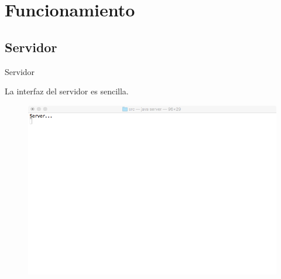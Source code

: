 \section{Funcionamiento}

\subsection{Servidor}
\begin{frame}{Servidor}
	\begin{block}{  }
		La interfaz del servidor es sencilla.
	\end{block}
	
	\begin{exampleblock}{ }
		\begin{figure}[H]
			\includegraphics[scale=0.31]{./Imagenes/server1.png}
		\end{figure}
	\end{exampleblock}
\end{frame}




